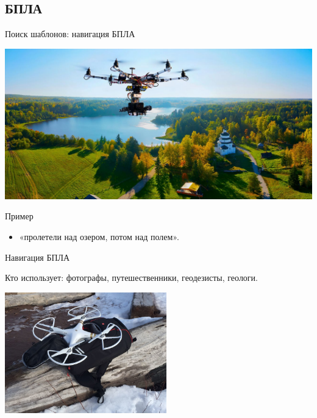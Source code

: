 \subsection{БПЛА}

\begin{frame}{Поиск шаблонов: навигация БПЛА}
    \begin{center}
        \includegraphics[width=\textwidth]{img/video/drone-3.jpg}
    \end{center}
    \begin{gray-box}{Пример}
        \begin{itemize}
            \item «пролетели над озером, потом над полем».
        \end{itemize}
    \end{gray-box}
\end{frame}

\begin{frame}{Навигация БПЛА}
    \begin{blue-box}{Кто использует:}
        фотографы, путешественники, геодезисты, геологи.
        \vspace{0.5em}
        \begin{center}
            \includegraphics[width=7cm]{img/video/drone-2.jpg}
        \end{center}
        \vspace{0.5em}
    \end{blue-box}
\end{frame}

